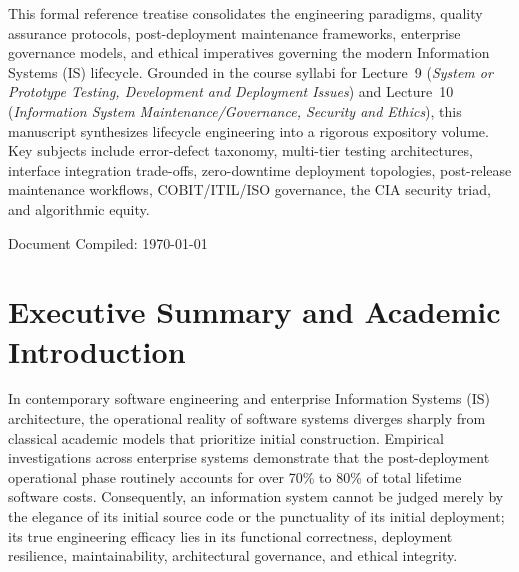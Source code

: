 \documentclass[11pt,a4paper]{article}
\begin{document}
\begin{titlepage}
    \vspace{2.5cm}
    
    \begin{tcolorbox}[colback=lightBg,colframe=primaryNavy,arc=4pt,boxrule=1pt,title={\bfseries Academic Abstract and Scope},fonttitle=\bfseries]
    This formal reference treatise consolidates the engineering paradigms, quality assurance protocols, post-deployment maintenance frameworks, enterprise governance models, and ethical imperatives governing the modern Information Systems (IS) lifecycle. Grounded in the course syllabi for Lecture~9 (\textit{System or Prototype Testing, Development and Deployment Issues}) and Lecture~10 (\textit{Information System Maintenance/Governance, Security and Ethics}), this manuscript synthesizes lifecycle engineering into a rigorous expository volume. Key subjects include error-defect taxonomy, multi-tier testing architectures, interface integration trade-offs, zero-downtime deployment topologies, post-release maintenance workflows, COBIT/ITIL/ISO governance, the CIA security triad, and algorithmic equity.
    \end{tcolorbox}
    
    \vfill
    {\small Document Compiled: \today\par}
\end{titlepage}

\tableofcontents
\newpage
{}
\hypersetup{pageanchor=true}

\section{Executive Summary and Academic Introduction}
\label{sec:intro}

In contemporary software engineering and enterprise Information Systems (IS) architecture, the operational reality of software systems diverges sharply from classical academic models that prioritize initial construction. Empirical investigations across enterprise systems demonstrate that the post-deployment operational phase routinely accounts for over 70\% to 80\% of total lifetime software costs. Consequently, an information system cannot be judged merely by the elegance of its initial source code or the punctuality of its initial deployment; its true engineering efficacy lies in its functional correctness, deployment resilience, maintainability, architectural governance, and ethical integrity.
\end{document}
